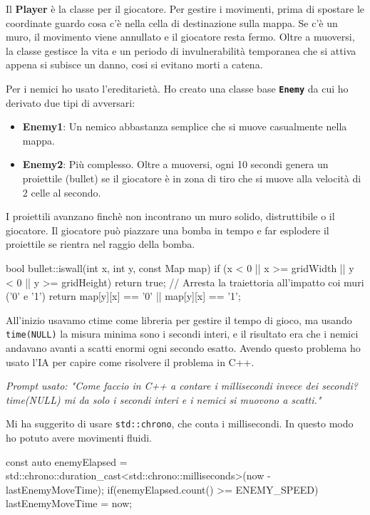 \documentclass[11pt,a4paper]{article}
\begin{document}
Il \textbf{Player} \`e la classe per il giocatore. Per gestire i movimenti, prima di spostare le coordinate guardo cosa c'\`e nella cella di destinazione sulla mappa. Se c'\`e un muro, il movimento viene annullato e il giocatore resta fermo. Oltre a muoversi, la classe gestisce la vita e un periodo di invulnerabilit\`a temporanea che si attiva appena si subisce un danno, cosi si evitano morti a catena.

Per i nemici ho usato l'ereditariet\`a. Ho creato una classe base \textbf{\texttt{Enemy}} da cui ho derivato due tipi di avversari:
\begin{itemize}
    \item \textbf{Enemy1}: Un nemico abbastanza semplice che si muove casualmente nella mappa.
    \item \textbf{Enemy2}: Pi\`u complesso. Oltre a muoversi, ogni 10 secondi genera un proiettile (bullet) se il giocatore è in zona di tiro che si muove alla velocità di 2 celle al secondo.
\end{itemize}

I proiettili avanzano finchè non incontrano un muro solido, distruttibile o il giocatore. Il giocatore può piazzare una bomba in tempo e far esplodere il proiettile se rientra nel raggio della bomba.
\begin{codesnap}
bool bullet::iswall(int x, int y, const Map map) {
    if (x < 0 || x >= gridWidth || y < 0 || y >= gridHeight) {
        return true;
    }
    // Arresta la traiettoria all'impatto coi muri ('0' e '1')
    return map[y][x] == '0' || map[y][x] == '1';
}
\end{codesnap}

All'inizio usavamo ctime come libreria per gestire il tempo di gioco, ma usando \texttt{time(NULL)} la misura minima sono i secondi interi, e il risultato era che i nemici andavano avanti a scatti enormi ogni secondo esatto.
Avendo questo problema ho usato l'IA per capire come risolvere il problema in C++.

\textit{Prompt usato: "Come faccio in C++ a contare i millisecondi invece dei secondi? time(NULL) mi da solo i secondi interi e i nemici si muovono a scatti."}

Mi ha suggerito di usare \texttt{std::chrono}, che conta i millisecondi. In questo modo ho potuto avere movimenti fluidi.
\begin{codesnap}
const auto enemyElapsed = std::chrono::duration_cast<std::chrono::milliseconds>(now - lastEnemyMoveTime);
if(enemyElapsed.count() >= ENEMY_SPEED) lastEnemyMoveTime = now;
\end{codesnap}
\end{document}

